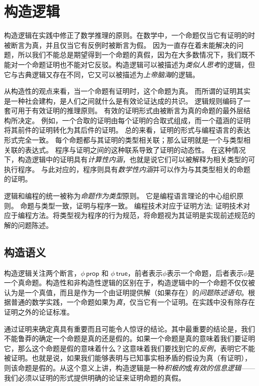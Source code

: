\chapter{构造逻辑}

构造逻辑在实践中修正了数学推理的原则。在数学中，一个命题仅当它有证明的时被断言为真，并且仅当它有反例时被断言为假。
因为一直存在着未能解决的问题，所以我们不能总是期望得到一个命题的真假，因为在大多数情况下，我们既不能对一个命题证明也不能对它反驳。构造逻辑可以被描述为\textit{类似人思考}的逻辑，但它与古典逻辑又存在不同，它又可以被描述为\textit{上帝脑海}的逻辑。

从构造性的观点来看，当一个命题有证明时，这个命题为真。 而所谓的证明其实是一种社会建构，是人们之间就什么是有效论证达成的共识。
逻辑规则编码了一套可用于有效证明的推理原则。 有效的证明形式由被断言为真的命题的最外层结构所决定。
例如，一个合取的证明由每个证明的合取式组成，而一个蕴涵的证明将其前件的证明转化为其后件的证明。 总的来看，证明的形式与编程语言的表达形式完全一致。
每个命题都与其证明的类型相关联；那么证明就是一个与类型相关联的表达式。 程序与证明之间的这种联系导致了证明的动态性。
在这种情况下，构造逻辑中的证明具有\textit{计算性内涵}，也就是说它们可以被解释为相关类型的可执行程序。
与此对应的，程序则具有\textit{数学性内涵}并可以作为与其类型相关的命题的证明。


逻辑和编程的统一被称为\textit{命题作为类型}原则。 它是编程语言理论的中心组织原则。 命题与类型一致，证明与程序一致。 编程技术对应于证明方法;  证明技术对应于编程方法。将类型视为程序的行为规范，将命题视为其证明是实现前述规范的解的问题陈述。
\section{构造语义}
构造逻辑关注两个断言，$\phi\,\mathsf{prop}$ 和 $\phi\,\mathsf{true}$，前者表示${\phi}$表示一个命题，后者表示${\phi}$是一个真命题。构造性和非构造性逻辑的区别在于，构造逻辑中的一个命题不仅仅被认为是一个真值，而且是作为一个由证明提供解（如果存在）的\textit{问题陈述语句}。根据普通的数学实践，一个命题如果为\textit{真}，仅当它有一个证明。在实践中没有除存在证明之外的论证标准。


通过证明来确定真具有重要而且可能令人惊讶的结论。其中最重要的结论是，我们不能鲁莽的确定一个命题是真的还是假的。如果一个命题是真的意味着我们要证明它，那么这个命题是假的意味着什么？这意味着我们要找到它的\textit{反例}，表明它不能被证明。也就是说，如果我们能够表明与已知事实相矛盾的假设为真（有证明），则该命题是假的。从这个意义上讲，构造逻辑是一种\textit{积极的}或\textit{有效的信息逻辑}——我们必须以证明的形式提供明确的论证来证明命题的真假。


